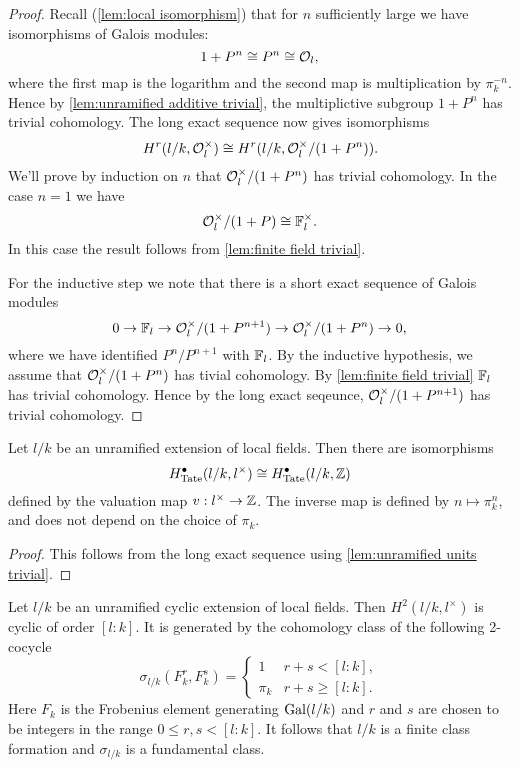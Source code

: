 \begin{proof}
	Recall (\ref{lem:local isomorphism}) that for $n$ sufficiently large we have isomorphisms of
	Galois modules:
	\[
		1 + P^n \cong P^n \cong {\mathcal O}_l,
	\]
	where the first map is the logarithm and the second map is multiplication by $\pi_k^{-n}$.
	Hence by \ref{lem:unramified additive trivial}, the multiplictive subgroup $1+P^n$ has trivial
	cohomology.
	The long exact sequence now gives isomorphisms
	\[
		H^r(l/k,{\mathcal O}_l^\times) \cong H^r(l/k,{\mathcal O}_l^\times / (1+P^n)).
	\]
	We'll prove by induction on $n$ that ${\mathcal O}_l^\times / (1+P^n)$ has trivial cohomology.
	In the case $n = 1$ we have
	\[
		{\mathcal O}_l^\times / (1+P) \cong {\mathbb F}_l^\times.
	\]
	In this case the result follows from \ref{lem:finite field trivial}.

	For the inductive step we note that there is a short exact sequence of Galois modules
	\[
		0 \to {\mathbb F}_l \to  {\mathcal O}_l^\times / (1+P^{n+1})  \to{\mathcal O}_l^\times / (1+P^n)  \to  0,
	\]
	where we have identified $P^n / P^{n+1}$ with ${\mathbb F}_l$.
	By the inductive hypothesis, we assume that ${\mathcal O}_l^\times / (1+P^n)$ has tivial cohomology.
	By \ref{lem:finite field trivial} ${\mathbb F}_l$ has trivial cohomology.
	Hence by the long exact seqeunce, ${\mathcal O}_l^\times / (1+P^{n+1})$ has trivial cohomology.
\end{proof}


\begin{corollary} \label{cor:cohomology unramified iso cohomology Z}
	Let $l/k$ be an unramified extension of local fields.
	Then there are isomorphisms
	\[
		H^\bullet_{\mathrm{Tate}}(l/k,l^\times) \cong H^\bullet_{\mathrm{Tate}} (l/k,{\mathbb Z})
	\]
	defined by the valuation map $v : l^\times \to {\mathbb Z}$.
	The inverse map is defined by $n \mapsto \pi_k^n$, and does not depend on the choice of $\pi_k$.
\end{corollary}

\begin{proof}
	This follows from the long exact sequence using \ref{lem:unramified units trivial}.
\end{proof}


\begin{lemma} \label{lem:unramified fundamental class}
	Let $l/k$ be an unramified cyclic extension of local fields.
	Then $H^2(l/k,l^\times)$ is cyclic of order $[l:k]$.
	It is generated by the cohomology class of the following 2-cocycle
	\[
		\sigma_{l/k} (F_k^r, F_k^s) =
		\begin{cases}
			1 & r + s < [l:k], \\
			\pi_k & r + s \ge [l:k].
		\end{cases}
	\]
	Here $F_k$ is the Frobenius element generating $\mathrm{Gal}(l/k)$ and $r$ and $s$
	are chosen to be integers in the range $0 \le r,s <[l:k]$.
	It follows that $l / k$ is a finite class formation and $\sigma_{l/k}$ is a fundamental class.
\end{lemma}

